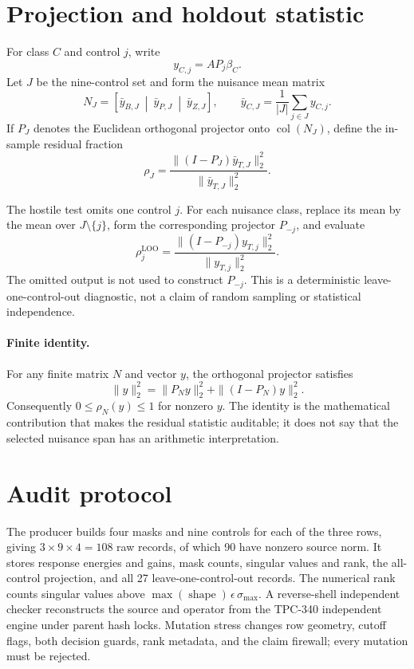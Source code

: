 \documentclass[10pt]{article}
\begin{document}
\section{Projection and holdout statistic}

For class $C$ and control $j$, write
\[
 y_{C,j}=A P_j\beta_C.
\]
Let $J$ be the nine-control set and form the nuisance mean matrix
\[
 N_J=\left[\bar y_{B,J}\ \middle|\ \bar y_{P,J}\ \middle|\ \bar y_{Z,J}\right],
 \qquad
 \bar y_{C,J}=\frac1{|J|}\sum_{j\in J}y_{C,j}.
\]
If $P_J$ denotes the Euclidean orthogonal projector onto
$\operatorname{col}(N_J)$, define the in-sample residual fraction
\[
 \rho_J=\frac{\|(I-P_J)\bar y_{T,J}\|_2^2}
                 {\|\bar y_{T,J}\|_2^2}.
 \label{eq:insample}
\]

The hostile test omits one control $j$.  For each nuisance class, replace its
mean by the mean over $J\setminus\{j\}$, form the corresponding projector
$P_{-j}$, and evaluate
\[
 \rho^{\mathrm{LOO}}_j=
 \frac{\|(I-P_{-j})y_{T,j}\|_2^2}{\|y_{T,j}\|_2^2}.
 \label{eq:loo}
\]
The omitted output is not used to construct $P_{-j}$.  This is a deterministic
leave-one-control-out diagnostic, not a claim of random sampling or
statistical independence.

\paragraph{Finite identity.}
For any finite matrix $N$ and vector $y$, the orthogonal projector satisfies
\[
 \|y\|_2^2=\|P_Ny\|_2^2+\|(I-P_N)y\|_2^2.
 \label{eq:pythagorean}
\]
Consequently $0\leq\rho_N(y)\leq1$ for nonzero $y$.  The identity is the
mathematical contribution that makes the residual statistic auditable; it does
not say that the selected nuisance span has an arithmetic interpretation.

\section{Audit protocol}

The producer builds four masks and nine controls for each of the three rows,
giving $3\times9\times4=108$ raw records, of which 90 have nonzero source
norm.  It stores response energies and gains, mask counts, singular values and
rank, the all-control projection, and all 27 leave-one-control-out records.
The numerical rank counts singular values above
$\max(\operatorname{shape})\,\epsilon\,\sigma_{\max}$.  A reverse-shell
independent checker reconstructs the source and operator from the TPC-340
independent engine under parent hash locks.  Mutation stress changes row
geometry, cutoff flags, both decision guards, rank metadata, and the claim
firewall; every mutation must be rejected.
\end{document}
